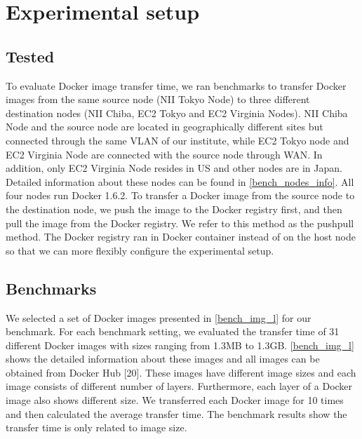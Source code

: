 \documentclass{ieicej}
\begin{document}
\section{Experimental setup}
\subsection{Tested}
To evaluate Docker image transfer time, we ran benchmarks to transfer Docker images from the same source node (NII Tokyo Node) to three different destination nodes (NII Chiba, EC2 Tokyo and EC2 Virginia Nodes).
NII Chiba Node and the source node are located in geographically different sites but connected through the same VLAN of our institute, while EC2 Tokyo node and EC2 Virginia Node are connected with the source node through WAN.
In addition, only EC2 Virginia Node resides in US and other nodes are in Japan.
Detailed information about these nodes can be found in \cref{bench_nodes_info}.
All four nodes run Docker 1.6.2. To transfer a Docker image from the source node to the destination node, we push the image to the Docker registry first, and then pull the image from the Docker registry.
We refer to this method as the pushpull method.
The Docker registry ran in Docker container instead of on the host node so that we can more flexibly configure the experimental setup.

\subsection{Benchmarks}
We selected a set of Docker images presented in \cref{bench_img_l} for our benchmark. For each benchmark setting, we evaluated the transfer time of 31 different Docker images with sizes ranging from 1.3MB to 1.3GB.
\cref{bench_img_l} shows the detailed information about these images and all images can be obtained from Docker Hub [20].
These images have different image sizes and each image consists of different number of layers.
Furthermore, each layer of a Docker image also shows different size.
We transferred each Docker image for 10 times and then calculated the average transfer time.
The benchmark results show the transfer time is only related to image size.
\end{document}
